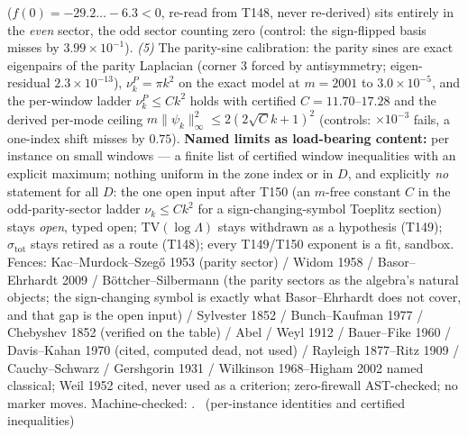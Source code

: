 \documentclass[11pt,a4paper]{article}
\begin{document}
($f(0)=-29.2\ldots-6.3<0$, re-read from T148, never re-derived) sits
entirely in the \emph{even} sector, the odd sector counting zero (control:
the sign-flipped basis misses by $3.99\times10^{-1}$). \emph{(5)} The
parity-sine calibration: the parity sines are exact eigenpairs of the
parity Laplacian (corner $3$ forced by antisymmetry; eigen-residual
$2.3\times10^{-13}$), $\nu^P_k=\pi k^2$ on the exact model at $m=2001$ to
$3.0\times10^{-5}$, and the per-window ladder $\nu^P_k\le Ck^2$ holds with
certified $C=11.70$--$17.28$ and the derived per-mode ceiling
$m\|\psi_k\|_\infty^2\le2(2\sqrt Ck+1)^2$ (controls: $\times10^{-3}$
fails, a one-index shift misses by $0.75$).
\textbf{Named limits as load-bearing content:} per instance on small windows
--- a finite list of certified window inequalities with an explicit maximum;
nothing uniform in the zone index or in $D$, and explicitly \emph{no}
statement for all $D$: the one open input after T150 (an $m$-free constant
$C$ in the odd-parity-sector ladder $\nu_k\le Ck^2$ for a
sign-changing-symbol Toeplitz section) stays \emph{open}, typed open;
$\mathrm{TV}(\log\Lambda)$ stays withdrawn as a hypothesis (T149);
$\sigma_{\mathrm{tot}}$ stays retired as a route (T148); every T149/T150
exponent is a fit, sandbox. Fences: Kac--Murdock--Szeg\H{o} 1953 (parity
sector) / Widom 1958 / Basor--Ehrhardt 2009 / B\"ottcher--Silbermann (the
parity sectors as the algebra's natural objects; the sign-changing symbol
is exactly what Basor--Ehrhardt does not cover, and that gap is the open
input) / Sylvester 1852 / Bunch--Kaufman 1977 / Chebyshev 1852 (verified on
the table) / Abel / Weyl 1912 / Bauer--Fike 1960 / Davis--Kahan 1970
(cited, computed dead, not used) / Rayleigh 1877--Ritz 1909 /
Cauchy--Schwarz / Gershgorin 1931 / Wilkinson 1968--Higham 2002 named
classical; Weil 1952 cited, never used as a criterion; zero-firewall
AST-checked; no marker moves.
Machine-checked: .
\mE\ (per-instance identities and certified inequalities)
\end{document}
